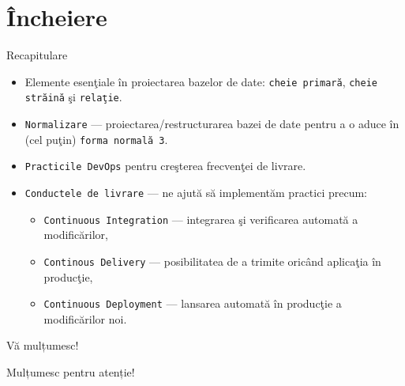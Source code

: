 \documentclass[presentation]{beamer}
\begin{document}
\section{Încheiere}
\label{sec:orgee205eb}
\begin{frame}[label={sec:orgc90892a},fragile]{Recapitulare}
 \pause
\begin{itemize}
\item Elemente esenţiale în proiectarea bazelor de date: \texttt{cheie primară}, \texttt{cheie străină} şi \texttt{relaţie}.
\end{itemize}
\pause
\begin{itemize}
\item \texttt{Normalizare} --- proiectarea/restructurarea bazei de date pentru a o aduce în (cel puţin) \texttt{forma normală 3}.
\end{itemize}
\pause
\begin{itemize}
\item \texttt{Practicile DevOps} pentru creşterea frecvenţei de livrare.
\end{itemize}
\pause
\begin{itemize}
\item \texttt{Conductele de livrare} --- ne ajută să implementăm practici precum:
\begin{itemize}
\item \texttt{Continuous Integration} --- integrarea şi verificarea automată a modificărilor,
\item \texttt{Continous Delivery} --- posibilitatea de a trimite oricând aplicaţia în producţie,
\item \texttt{Continuous Deployment} --- lansarea automată în producţie a modificărilor noi.
\end{itemize}
\end{itemize}
\end{frame}
\begin{frame}[label={sec:org58f89da}]{Vă mulțumesc!}
\begin{center}
Mulțumesc pentru atenție!
\end{center}
\end{frame}
\end{document}
